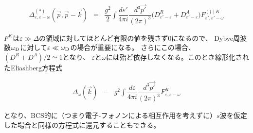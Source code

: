 \documentclass[uplatex,a4j,12pt,dvipdfmx]{jsarticle}
\begin{document}
\begin{eqnarray}
	\Delta_{\varepsilon , \varepsilon - \omega}^{(*)} (\vec{p} , \vec{p} - \vec{k})
	&=&
	\dfrac{g^{2}}{2}
	\int \!\! \dfrac{d \varepsilon'}{4 \pi i} \dfrac{d^{3} \vec{p'}}{ (2 \pi)^{3}}
	\big( D^{R}_{\varepsilon' - \varepsilon} + D^{A}_{\varepsilon' - \varepsilon} \big)
	F^{(\dagger)K}_{\varepsilon' , \varepsilon' - \omega}
\end{eqnarray}

$F^{K}$は$\varepsilon \gg \Delta$の領域に対してほとんど有限の値を残さず0になるので、
Dybye周波数$\omega_{\rm D}$に対して$\varepsilon \ll \omega_{\rm D}$の場合が重要になる。
さらにこの場合、$(D^{R} + D^{A})/2 \simeq 1$となり、
$\varepsilon$と$\omega$には殆ど依存しなくなる。このとき線形化されたEliashberg方程式

\begin{eqnarray}
	\Delta_{\omega}^{} (\vec{k})
	&=&
	g^{2}
	\int \!\! \dfrac{d \varepsilon}{4 \pi i} \dfrac{d^{3} \vec{p'}}{ (2 \pi)^{3}}
	F^{K}_{\varepsilon , \varepsilon - \omega}
\end{eqnarray}

となり、BCS的に（つまり電子-フォノンによる相互作用を考えずに）$s$波を仮定した場合と同様の方程式に還元することもできる。
\end{document}
